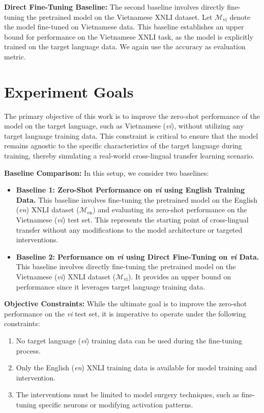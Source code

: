 \textbf{Direct Fine-Tuning Baseline:} The second baseline involves directly fine-tuning the pretrained model on the Vietnamese XNLI dataset. Let \(\mathcal{M}_\text{vi}\) denote the model fine-tuned on Vietnamese data. This baseline establishes an upper bound for performance on the Vietnamese XNLI task, as the model is explicitly trained on the target language data. We again use the accuracy as evaluation metric.

\section{Experiment Goals}

The primary objective of this work is to improve the zero-shot performance of the model on the target language, such as Vietnamese (\textit{vi}), without utilizing any target language training data. This constraint is critical to ensure that the model remains agnostic to the specific characteristics of the target language during training, thereby simulating a real-world cross-lingual transfer learning scenario.

\textbf{Baseline Comparison:} In this setup, we consider two baselines:
\begin{itemize}
	\item \textbf{Baseline 1: Zero-Shot Performance on \textit{vi} using English Training Data.} This baseline involves fine-tuning the pretrained model on the English (\textit{en}) XNLI dataset (\(\mathcal{M}_\text{en}\)) and evaluating its zero-shot performance on the Vietnamese (\textit{vi}) test set. This represents the starting point of cross-lingual transfer without any modifications to the model architecture or targeted interventions.
	\item \textbf{Baseline 2: Performance on \textit{vi} using Direct Fine-Tuning on \textit{vi} Data.} This baseline involves directly fine-tuning the pretrained model on the Vietnamese (\textit{vi}) XNLI dataset (\(\mathcal{M}_\text{vi}\)). It provides an upper bound on performance since it leverages target language training data.
\end{itemize}

\textbf{Objective Constraints:} While the ultimate goal is to improve the zero-shot performance on the \textit{vi} test set, it is imperative to operate under the following constraints:
\begin{enumerate}
	\item No target language (\textit{vi}) training data can be used during the fine-tuning process.
	\item Only the English (\textit{en}) XNLI training data is available for model training and intervention.
	\item The interventions must be limited to model surgery techniques, such as fine-tuning specific neurons or modifying activation patterns.
\end{enumerate}

